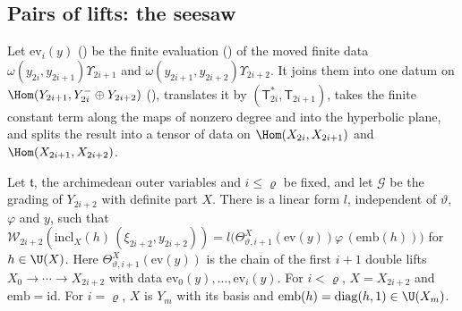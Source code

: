 \subsection{Pairs of lifts: the seesaw}

Let $\mathrm{ev}_i(y)$ () be the finite evaluation
() of the moved finite data
$\omega(y_{2i},y_{2i+1})\Upsilon_{2i+1}$ and $\omega(y_{2i+1},y_{2i+2})\Upsilon_{2i+2}$. It joins
them into one datum on $\Hom(Y_{2i+1},Y_{2i}^-\oplus Y_{2i+2})$ (),
translates it by $(\mathsf T_{2i}^*,\mathsf T_{2i+1})$, takes the finite constant term along the maps of nonzero
degree and into the hyperbolic plane, and splits the result into a tensor of data on
$\Hom(X_{2i},X_{2i+1})$ and $\Hom(X_{2i+1},X_{2i+2})$.

\begin{lemma}\label{ub-seesaw:lem:double}
Let $\mathfrak t$, the archimedean outer variables and $i\le\varrho$ be fixed, and let $\mathcal G$ be the grading of
$Y_{2i+2}$ with definite part $X$. There is a linear form $l$, independent of $\vartheta$,
$\varphi$ and $y$, such that
$\mathcal W_{2i+2}(\mathrm{incl}_X(h)\,(\xi_{2i+2},y_{2i+2}))
=l\bigl(\Theta^X_{\vartheta,i+1}(\mathrm{ev}(y))\varphi\,(\mathrm{emb}(h))\bigr)$ for $h\in\U(X)$.
Here $\Theta^X_{\vartheta,i+1}(\mathrm{ev}(y))$ is the chain of the first $i+1$ double lifts
$X_0\to\cdots\to X_{2i+2}$ with data $\mathrm{ev}_0(y),\dots,\mathrm{ev}_i(y)$. For $i<\varrho$,
$X=X_{2i+2}$ and $\mathrm{emb}=\mathrm{id}$. For $i=\varrho$, $X$ is $Y_m$ with its basis and
$\mathrm{emb}(h)=\operatorname{diag}(h,1)\in\U(X_m)$.
\end{lemma}

